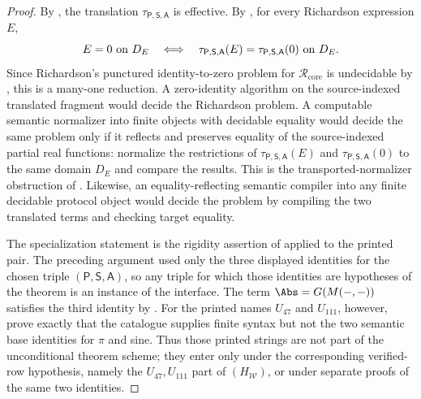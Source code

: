 \begin{proof}
By , the
translation \(\tau_{\mathsf P,\mathsf S,\mathsf A}\) is effective.  By
, for every Richardson expression
\(E\),
\[
  E=0\hbox{ on }D_E
  \quad\Longleftrightarrow\quad
  \tau_{\mathsf P,\mathsf S,\mathsf A}(E)=
  \tau_{\mathsf P,\mathsf S,\mathsf A}(0)
  \hbox{ on }D_E .
\]
Since Richardson's punctured identity-to-zero problem for
\(\mathcal R_{\mathrm{core}}\) is undecidable by
, this is a many-one reduction.  A
zero-identity algorithm on the source-indexed translated fragment would decide
the Richardson problem.  A computable semantic normalizer into finite objects
with decidable equality would decide the same problem only if it reflects and
preserves equality of the source-indexed partial real functions: normalize the
restrictions of \(\tau_{\mathsf P,\mathsf S,\mathsf A}(E)\) and
\(\tau_{\mathsf P,\mathsf S,\mathsf A}(0)\) to the same domain \(D_E\) and compare
the results.  This is the transported-normalizer obstruction of
.  Likewise, an
equality-reflecting semantic compiler into any finite decidable protocol object
would decide the problem by compiling the two translated terms and checking
target equality.

The specialization statement is the rigidity assertion of
 applied to the printed pair.  The
preceding argument used only the three displayed identities for the chosen
triple \((\mathsf P,\mathsf S,\mathsf A)\), so any triple for which those
identities are hypotheses of the theorem is an instance of the interface.  The term
\(\Abs=G(M(-,-))\) satisfies the third identity by
.  For the printed names
\(U_{47}\) and \(U_{111}\), however,
prove exactly that the catalogue supplies finite syntax but not the two semantic
base identities for \(\pi\) and sine.  Thus those printed strings are not part of
the unconditional theorem scheme; they enter only under the corresponding
verified-row hypothesis, namely the \(U_{47},U_{111}\) part of
\((H_{\mathcal W})\), or under separate proofs of the same two identities.


\end{proof}
